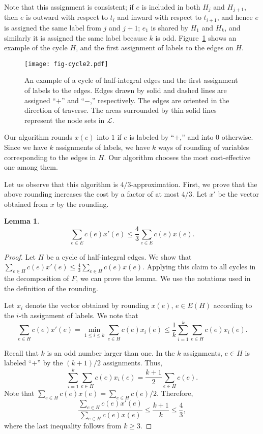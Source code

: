 \documentclass{article}
\newtheorem{lemma}{Lemma}
\newcommand{\Lfam}{\mathcal{L}}
\begin{document}
Note that this assignment is consistent;
if
$e$ is included in both $H_j$ and $H_{j+1}$, then
$e$ is outward with respect to $t_i$ and inward with respect to
$t_{i+1}$,
and hence $e$ is assigned the same label from $j$ and $j+1$;
$e_1$ is shared by $H_1$ and $H_k$, and similarly it is assigned the same label 
because $k$ is odd.
Figure~\ref{fig.cicle2} shows an example of the cycle $H$, and the first
assignment of labels to the edges on $H$.

\begin{figure}
 \centering
 \texttt{[image: fig-cycle2.pdf]}
\caption{An example of a cycle of half-integral edges and the first
 assignment of labels to the edges. 
Edges drawn by 
solid and dashed lines are assigned ``$+$'' and ``$-$,'' respectively.
The edges are oriented in the direction of traverse. The areas surrounded by thin solid lines
represent the node sets in $\Lfam$.}
\label{fig.cicle2}
\end{figure}


Our algorithm rounds $x(e)$ into $1$ if $e$ is labeled by ``$+$,''
and into $0$ otherwise. 
Since we have $k$ assignments of labels, we have $k$ ways of rounding of
variables corresponding to the edges in $H$.
Our algorithm chooses the most cost-effective one among them.

Let us observe that this algorithm is $4/3$-approximation. First, we
prove that the above rounding increases the cost by a factor of at most $4/3$.
Let $x'$ be the vector obtained from $x$ by the rounding.

\begin{lemma}\label{lem.cost-terminal}
\[
\sum_{e \in E}c(e)x'(e) \leq \frac{4}{3} \sum_{e \in E}c(e)x(e).
\]
\end{lemma}
\begin{proof}
 Let $H$ be a cycle of half-integral edges.
 We show that $\sum_{e \in H}c(e)x'(e) \leq \frac{4}{3} \sum_{e \in H}c(e)x(e)$.
 Applying this claim to all cycles in the decomposition of $F$, we
 can prove the lemma.
 We use the notations used in the definition of the rounding.
 
 Let $x_{i}$ denote the vector obtained by rounding $x(e)$, $e \in E(H)$
according to the $i$-th assignment of labels.
We note that 
\[\sum_{e \in H}c(e)x'(e)= \min_{1\leq i \leq k} \sum_{e \in H}c(e)x_{i}(e)  \leq \frac{1}{k} \sum_{i=1}^k\sum_{e \in H}c(e)x_{i}(e).
\] 

Recall that $k$ is an odd number larger than one.
In the $k$ assignments, $e \in H$ is 
labeled ``$+$'' by the $(k+1)/2$ assignments.
Thus, 
\[
\sum_{i=1}^k\sum_{e \in H}c(e)x_{i}(e) =\frac{k+1}{2} \sum_{e \in H}c(e).
\]
Note that $\sum_{e \in H}c(e)x(e)=\sum_{e \in H}c(e)/2$. Therefore,
\[
	\frac{\sum_{e \in H}c(e)x'(e)}{\sum_{e \in H}c(e)x(e)}
	\leq
	\frac{k+1}{k} \leq \frac{4}{3},
\]
where the last inequality follows from $k\geq 3$.
\end{proof}
\end{document}
